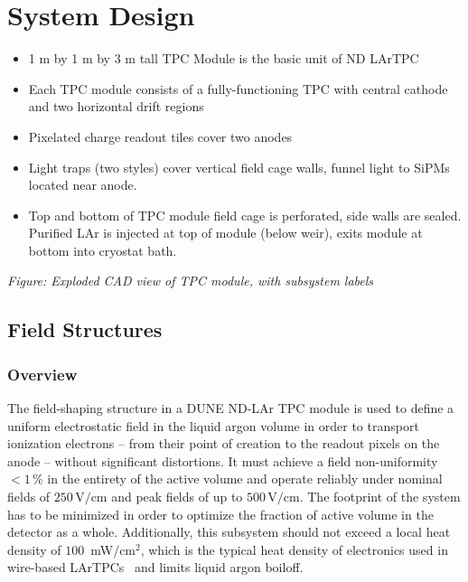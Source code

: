 

\section{System Design}
\label{sec:lartpc-des}

\begin{itemize}
    \item 1 m by 1 m by 3 m tall TPC Module is the basic unit of ND LArTPC
    \item Each TPC module consists of a fully-functioning TPC with central cathode and two horizontal drift regions
    \item Pixelated charge readout tiles cover two anodes
    \item Light traps (two styles) cover vertical field cage walls, funnel light to SiPMs located near anode.
    \item Top and bottom of TPC module field cage is perforated, side walls are sealed.  Purified LAr is injected at top of module (below weir), exits module at bottom into cryostat bath.
\end{itemize}

{\it Figure: Exploded CAD view of TPC module, with subsystem labels}

\subsection{Field Structures}
\label{sec:lartpc-des-fieldstruc}

\subsubsection{Overview}
\label{sec:lartpc-fs-ovvw}
The field-shaping structure in a DUNE ND-LAr TPC module is used to define a uniform electrostatic field in the liquid argon volume in order to transport ionization electrons -- from their point of creation to the readout pixels on the anode -- without significant distortions. It must achieve a field non-uniformity $<1\,\%$ in the entirety of the active volume and operate reliably under nominal fields of $250\,$V$/$cm and peak fields of up to $500\,$V$/$cm. The footprint of the system has to be minimized in order to optimize the fraction of active volume in the detector as a whole. Additionally, this subsystem should not exceed a local heat density of $100\,$ mW/cm$^2$, which is the typical heat density of electronics used in wire-based LArTPCs~\cite{notsure} and limits liquid argon boiloff.
